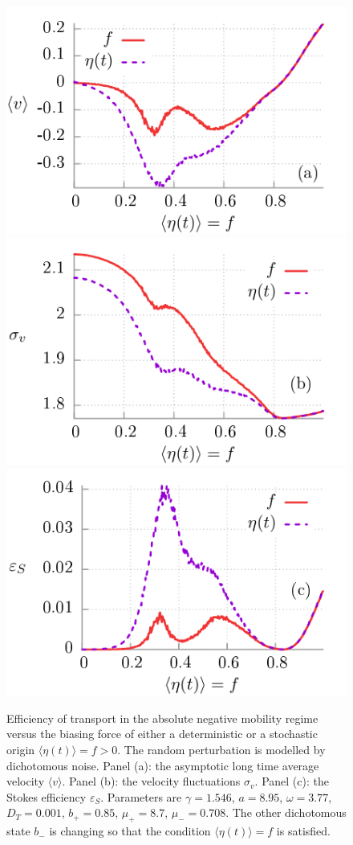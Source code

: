 \documentclass[12pt]{iopart}
\begin{document}
\begin{figure}[t]
	\centering
	\includegraphics[width=0.45\linewidth]{fig2a.pdf}
	\includegraphics[width=0.45\linewidth]{fig2b.pdf}\\
	\includegraphics[width=0.45\linewidth]{fig2c.pdf}
	\caption{Efficiency of transport in the absolute negative mobility regime versus the biasing force of either a deterministic or a stochastic origin $\langle \eta(t) \rangle = f > 0$. The random perturbation is modelled by dichotomous noise. Panel (a): the asymptotic long time average velocity $\langle v \rangle$. Panel (b): the velocity fluctuations $\sigma_v$. Panel (c): the Stokes efficiency $\varepsilon_S$. Parameters are $\gamma = 1.546$, $a = 8.95$, $\omega = 3.77$, $D_T = 0.001$, $b_+ = 0.85$, $\mu_+ = 8.7$, $\mu_- = 0.708$. The other dichotomous state $b_-$ is changing so that the condition $\langle \eta(t) \rangle = f$ is satisfied.}
	\label{fig2}
\end{figure}
\end{document}
